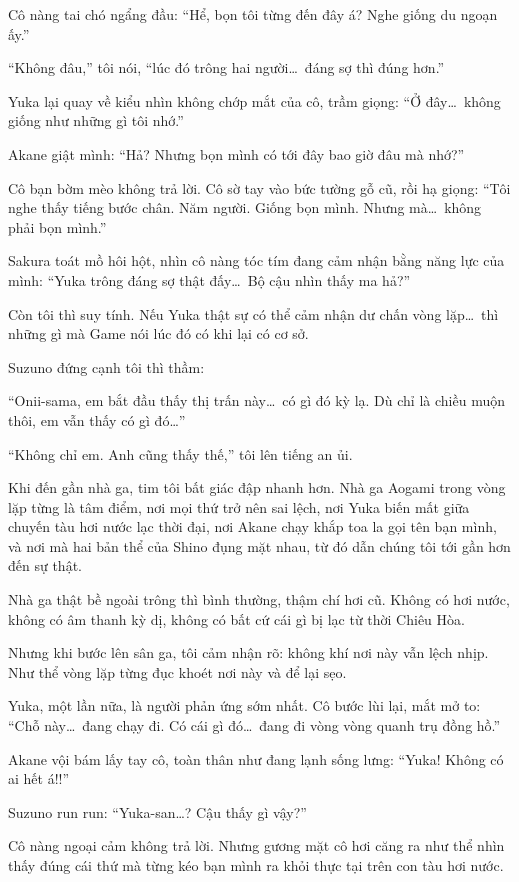 \documentclass[../main.tex]{subfiles}
\begin{document}
Cô nàng tai chó ngẩng đầu: ``Hể, bọn tôi từng đến đây á? Nghe giống du ngoạn ấy.''

``Không đâu,'' tôi nói, ``lúc đó trông hai người\dots\ đáng sợ thì đúng hơn.''

Yuka lại quay về kiểu nhìn không chớp mắt của cô, trầm giọng: ``Ở đây\dots\ không giống như những gì tôi nhớ.''

Akane giật mình: ``Hả? Nhưng bọn mình có tới đây bao giờ đâu mà nhớ?''

Cô bạn bờm mèo không trả lời. Cô sờ tay vào bức tường gỗ cũ, rồi hạ giọng: ``Tôi nghe thấy tiếng bước chân. Năm người. Giống bọn mình. Nhưng mà\dots\ không phải bọn mình.''

Sakura toát mồ hôi hột, nhìn cô nàng tóc tím đang cảm nhận bằng năng lực của mình: ``Yuka trông đáng sợ thật đấy\dots\ Bộ cậu nhìn thấy ma hả?''

Còn tôi thì suy tính. Nếu Yuka thật sự có thể cảm nhận dư chấn vòng lặp\dots\ thì những gì mà Game nói lúc đó có khi lại có cơ sở.

Suzuno đứng cạnh tôi thì thầm:

``Onii-sama, em bắt đầu thấy thị trấn này\dots\ có gì đó kỳ lạ. Dù chỉ là chiều muộn thôi, em vẫn thấy có gì đó\dots''

``Không chỉ em. Anh cũng thấy thế,'' tôi lên tiếng an ủi.

Khi đến gần nhà ga, tim tôi bất giác đập nhanh hơn. Nhà ga Aogami trong vòng lặp từng là tâm điểm, nơi mọi thứ trở nên sai lệch, nơi Yuka biến mất giữa chuyến tàu hơi nước lạc thời đại, nơi Akane chạy khắp toa la gọi tên bạn mình, và nơi mà hai bản thể của Shino đụng mặt nhau, từ đó dẫn chúng tôi tới gần hơn đến sự thật.

Nhà ga thật bề ngoài trông thì bình thường, thậm chí hơi cũ. Không có hơi nước, không có âm thanh kỳ dị, không có bất cứ cái gì bị lạc từ thời Chiêu Hòa.

Nhưng khi bước lên sân ga, tôi cảm nhận rõ: không khí nơi này vẫn lệch nhịp. Như thể vòng lặp từng đục khoét nơi này và để lại sẹo.

Yuka, một lần nữa, là người phản ứng sớm nhất. Cô bước lùi lại, mắt mở to: ``Chỗ này\dots\ đang chạy đi. Có cái gì đó\dots\ đang đi vòng vòng quanh trụ đồng hồ.''

Akane vội bám lấy tay cô, toàn thân như đang lạnh sống lưng: ``Yuka! Không có ai hết á!!''

Suzuno run run: ``Yuka-san\dots? Cậu thấy gì vậy?''

Cô nàng ngoại cảm không trả lời. Nhưng gương mặt cô hơi căng ra như thể nhìn thấy đúng cái thứ mà từng kéo bạn mình ra khỏi thực tại trên con tàu hơi nước.
\end{document}
